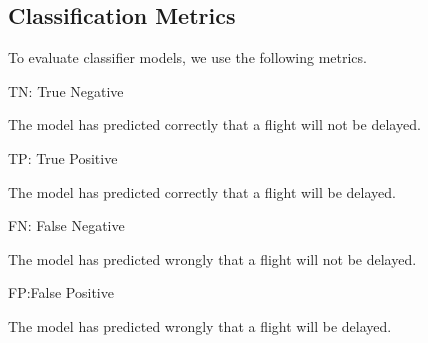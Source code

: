 \documentclass[12pt,letter-paper]{article}
\begin{document}
     \subsection{Classification Metrics}
        \linebreak
            \begin{flushleft}
                To evaluate classifier models, we use the following metrics.
                \linebreak
                
                TN: True Negative
                
                The model has predicted correctly that a flight will not be delayed.
                \linebreak
                
                TP: True Positive
                
                The model has predicted correctly that a flight will be delayed.
                \linebreak
                
                FN: False Negative
                
                The model has predicted wrongly that a flight will not be delayed.
                \linebreak
                
                FP:False Positive
                
                The model has predicted wrongly that a flight will be delayed.
                \linebreak
            \end{flushleft}
\end{document}
